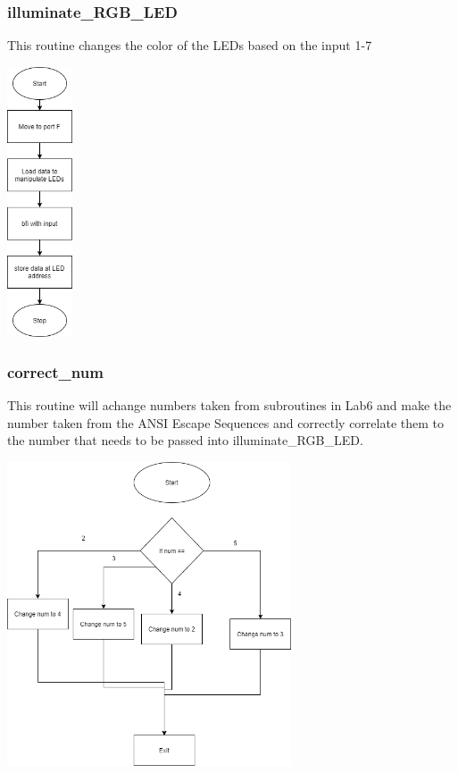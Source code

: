 \documentclass{article}
\begin{document}
    \newpage
    \subsubsection{illuminate\_RGB\_LED}
        This routine changes the color of the LEDs based on the input 1-7
        \begin{center}
            {\includegraphics[height=8cm]{illuminate_RGB_LED.png}\centering} 
        \end{center}

    \newpage
    \subsubsection{correct\_num}
        This routine will achange numbers taken from subroutines in Lab6 and make
        the number taken from the ANSI Escape Sequences and correctly correlate them
        to the number that needs to be passed into illuminate\_RGB\_LED.
        \begin{center}
            {\includegraphics[height=9cm]{correct_num.png}\centering} 
        \end{center}
\end{document}

